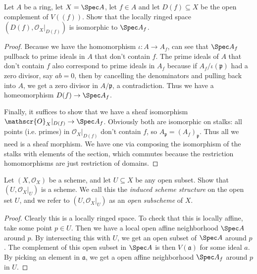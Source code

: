 \begin{exercise}
	Let $A $ be a ring, let $X = \Spec A $, let $f \in A $ and let $D(f) \subseteq X $ be the open complement of $V((f)) $. Show that the locally ringed space $(D(f),\mathscr{O}_X|_{D(f)}) $ is isomorphic to $\Spec A_f $.
\end{exercise}
\begin{proof}
	Because we have the homomorphism $\iota: A \to A_f $, can see that $\Spec A_f $ pullback to prime ideals in $A $ that don't contain $f $.
	The prime ideals of $A $ that don't contain $f $ also correspond to prime ideals in $A_f $ because if $A_f / \iota(\mathfrak{p})$ had a zero divisor, say $ab = 0 $, then by cancelling the denominators and pulling back into $A $, we get a zero divisor in $A / \mathfrak{p} $, a contradiction.
	Thus we have a homeomorphism $D(f) \to \Spec A_f $.

	Finally, it suffices to show that we have a sheaf isomorphism $\mathscr{O}_X|_{D(f)}\to \Spec A_f $.
	Obviously both are isomorphic on stalks: all points (i.e. primes) in $\mathscr{O}_X|_{D(f)} $ don't contain $f $, so $A_{\mathfrak{p}} = (A_f)_{\mathfrak{p}}$.
	Thus all we need is a sheaf morphism.
	We have one via composing the isomorphism of the stalks with elements of the section, which commutes because the restriction homomorphisms are just restriction of domains.
\end{proof}

\begin{exercise}
	Let $(X, \mathscr{O}_X) $ be a scheme, and let $U \subseteq X $ be any open subset. Show that $(U, \mathscr{O}_X|_U)$ is a scheme. We call this the \textit{induced scheme structure} on the open set $U $, and we refer to $(U, \mathscr{O}_X|_U) $ as an \textit{open subscheme} of $X $.
\end{exercise}
\begin{proof}
	Clearly this is a locally ringed space.
	To check that this is locally affine, take some point $p \in U $.
	Then we have a local open affine neighborhood $\Spec A $ around $p $.
	By intersecting this with $U $, we get an open subset of $\Spec A $ around $p $.
	The complement of this open subset in $\Spec A $ is then $V(\mathfrak{a}) $ for some ideal $a $.
	By picking an element in $\mathfrak{a} $, we get a open affine neighborhood $\Spec A_f $ around $p $ in $U $.
\end{proof}

